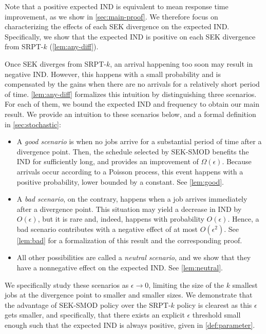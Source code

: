 \documentclass[acmsmall]{acmart}
\begin{document}
Note that a positive expected IND is equivalent to mean response time improvement, as we show in \cref{sec:main-proof}. We therefore focus on characterizing the effects of each SEK divergence on the expected IND. Specifically, we show that the expected IND is positive on each SEK divergence from SRPT-$k$ (\cref{lem:any-diff}).

Once SEK diverges from SRPT-$k$, an arrival happening too soon may result in negative IND. However, this happens with a small probability and is compensated by the gains when there are no arrivals for a relatively short period of time. \cref{lem:any-diff} formalizes this intuition by distinguishing three scenarios. For each of them, we bound the expected IND and frequency to obtain our main result. We provide an intuition to these scenarios below, and a formal definition in \cref{sec:stochastic}:
\begin{itemize}
    \item A \textit{good scenario} is when no jobs arrive for a substantial period of time after a divergence point. Then, the schedule selected by SEK-SMOD benefits the IND for sufficiently long, and provides an improvement of $\Omega(\epsilon)$. Because arrivals occur according to a Poisson process, this event happens with a positive probability, lower bounded by a constant. See \cref{lem:good}.
    \item A \textit{bad scenario}, on the contrary, happens when a job arrives immediately after a divergence point. This situation may yield a decrease in IND by $O(\epsilon)$, but it is rare and, indeed, happens with probability $O(\epsilon)$. Hence, a bad scenario contributes with a negative effect of at most $O(\epsilon^2)$. See \cref{lem:bad} for a formalization of this result and the corresponding proof.
    \item All other possibilities are called a \textit{neutral scenario}, and we show that they have a nonnegative effect on the expected IND. See \cref{lem:neutral}.
\end{itemize}


We specifically study these scenarios as $\epsilon \to 0$, limiting the size of the $k$ smallest jobs at the divergence point to smaller and smaller sizes.
We demonstrate that the advantage of SEK-SMOD policy over the SRPT-$k$ policy is clearest as this $\epsilon$ gets smaller, and specifically, that there exists an explicit $\epsilon$ threshold small enough such that the expected IND is always positive, given in \cref{def:parameter}.
\end{document}
